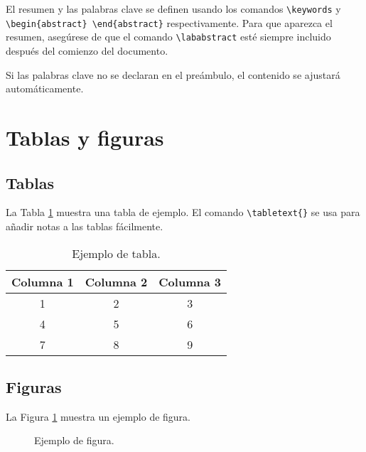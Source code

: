 \documentclass[9pt,a4paper,twocolumn,twoside]{lab-class/lab}
\begin{document}
    El resumen y las palabras clave se definen usando los comandos \verb*|\keywords| y \verb*|\begin{abstract} \end{abstract}| respectivamente. Para que aparezca el resumen, asegúrese de que el comando \verb|\lababstract| esté siempre incluido después del comienzo del documento.
    
    Si las palabras clave no se declaran en el preámbulo, el contenido se ajustará automáticamente.

\section{Tablas y figuras}

    \subsection{Tablas}
    
    La Tabla \ref{tab:ejemplo} muestra una tabla de ejemplo. El comando \verb|\tabletext{}| se usa para añadir notas a las tablas fácilmente.
    
    \begin{table}[H]
        \centering
        \caption{Ejemplo de tabla.}
        \label{tab:ejemplo}
        \begin{tabular}{ccc}
            \toprule
            Columna 1 & Columna 2 & Columna 3 \\
            \midrule
            1 & 2 & 3 \\
            4 & 5 & 6 \\
            7 & 8 & 9 \\
            \bottomrule
        \end{tabular}
    \end{table}

    \subsection{Figuras}
    
    La Figura \ref{fig:ejemplo} muestra un ejemplo de figura.
    
    \begin{figure}[H]
        \centering
        \fbox{\rule{0pt}{3cm}\rule{5cm}{0pt}}
        \caption{Ejemplo de figura.}
        \label{fig:ejemplo}
    \end{figure}
\end{document}
